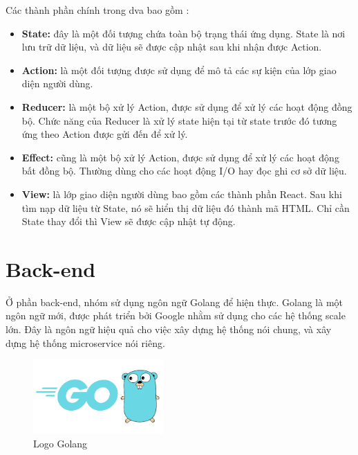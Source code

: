     Các thành phần chính trong dva bao gồm \cite{technologyDvaAdvance}:
    \begin{itemize}
        \item \textbf{State:} đây là một đối tượng chứa toàn bộ trạng thái ứng dụng. State là nơi lưu trữ dữ liệu, và dữ liệu sẽ được cập nhật sau khi nhận được Action.
        \item \textbf{Action:} là một đối tượng được sử dụng để mô tả các sự kiện của lớp giao diện người dùng.
        \item \textbf{Reducer:} là một bộ xử lý Action, được sử dụng để xử lý các hoạt động đồng bộ. Chức năng của Reducer là xử lý state hiện tại từ state trước đó tương ứng theo Action được gửi đến để xử lý.
        \item \textbf{Effect:} cũng là một bộ xử lý Action, được sử dụng để xử lý các hoạt động bất đồng bộ. Thường dùng cho các hoạt động I/O hay đọc ghi cơ sở dữ liệu.
        \item \textbf{View:} là lớp giao diện người dùng bao gồm các thành phần React. Sau khi tìm nạp dữ liệu từ State, nó sẽ hiển thị dữ liệu đó thành mã HTML. Chỉ cần State thay đổi thì View sẽ được cập nhật tự động.
    \end{itemize}

    
    
\section{Back-end}
\par Ở phần back-end, nhóm sử dụng ngôn ngữ Golang để hiện thực. Golang là một ngôn ngữ mới, được phát triển bởi Google nhằm sử dụng cho các hệ thống scale lớn. Đây là ngôn ngữ hiệu quả cho việc xây dựng hệ thống nói chung, và xây dựng hệ thống microservice nói riêng.

\begin{figure}[!htp]
    \begin{center}
    \includegraphics[width=5cm]{img/Technology/Golang.png}
    \end{center}
    \caption{Logo Golang \cite{technologyGolang}}
\end{figure}

